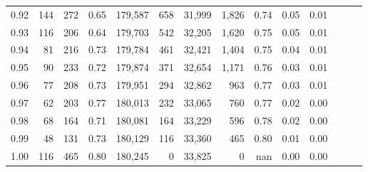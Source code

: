 \begin{tabular}{rrrrrrrrrrrrrr}
0.92 &    144 &  272 &  0.65 &  179,587 &      658 &  31,999 &   1,826 &  0.74 &  0.05 &      0.01 \\
0.93 &    116 &  206 &  0.64 &  179,703 &      542 &  32,205 &   1,620 &  0.75 &  0.05 &      0.01 \\
0.94 &     81 &  216 &  0.73 &  179,784 &      461 &  32,421 &   1,404 &  0.75 &  0.04 &      0.01 \\
0.95 &     90 &  233 &  0.72 &  179,874 &      371 &  32,654 &   1,171 &  0.76 &  0.03 &      0.01 \\
0.96 &     77 &  208 &  0.73 &  179,951 &      294 &  32,862 &     963 &  0.77 &  0.03 &      0.01 \\
0.97 &     62 &  203 &  0.77 &  180,013 &      232 &  33,065 &     760 &  0.77 &  0.02 &      0.00 \\
0.98 &     68 &  164 &  0.71 &  180,081 &      164 &  33,229 &     596 &  0.78 &  0.02 &      0.00 \\
0.99 &     48 &  131 &  0.73 &  180,129 &      116 &  33,360 &     465 &  0.80 &  0.01 &      0.00 \\
1.00 &    116 &  465 &  0.80 &  180,245 &        0 &  33,825 &       0 &   nan &  0.00 &      0.00 \\
\bottomrule
\end{tabular}

